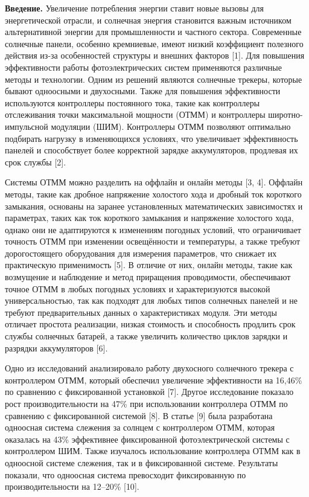 \begin{multicols}{2}
{\bfseries Введение.} Увеличение потребления энергии ставит новые вызовы
для энергетической отрасли, и солнечная энергия становится важным
источником альтернативной энергии для промышленности и частного сектора.
Современные солнечные панели, особенно кремниевые, имеют низкий
коэффициент полезного действия из-за особенностей структуры и внешних
факторов {[}1{]}. Для повышения эффективности работы фотоэлектрических
систем применяются различные методы и технологии. Одним из решений
являются солнечные трекеры, которые бывают одноосными и двухосными.
Также для повышения эффективности используются контроллеры постоянного
тока, такие как контроллеры отслеживания точки максимальной мощности
(ОТММ) и контроллеры широтно-импульсной модуляции (ШИМ). Контроллеры
ОТММ позволяют оптимально подбирать нагрузку в изменяющихся условиях,
что увеличивает эффективность панелей и способствует более корректной
зарядке аккумуляторов, продлевая их срок службы {[}2{]}.

Системы ОТММ можно разделить на оффлайн и онлайн методы {[}3, 4{]}.
Оффлайн методы, такие как дробное напряжение холостого хода и дробный
ток короткого замыкания, основаны на заранее установленных
математических зависимостях и параметрах, таких как ток короткого
замыкания и напряжение холостого хода, однако они не адаптируются к
изменениям погодных условий, что ограничивает точность ОТММ при
изменении освещённости и температуры, а также требуют дорогостоящего
оборудования для измерения параметров, что снижает их практическую
применимость {[}5{]}. В отличие от них, онлайн методы, такие как
возмущение и наблюдение и метод приращения проводимости, обеспечивают
точное ОТММ в любых погодных условиях и характеризуются высокой
универсальностью, так как подходят для любых типов солнечных панелей и
не требуют предварительных данных о характеристиках модуля. Эти методы
отличает простота реализации, низкая стоимость и способность продлить
срок службы солнечных батарей, а также увеличить количество циклов
зарядки и разрядки аккумуляторов {[}6{]}.

Одно из исследований анализировало работу двухосного солнечного трекера
с контроллером ОТММ, который обеспечил увеличение эффективности на
16,46\% по сравнению с фиксированной установкой {[}7{]}. Другое
исследование показало рост производительности на 47\% при использовании
контроллера ОТММ по сравнению с фиксированной системой {[}8{]}. В статье
{[}9{]} была разработана одноосная система слежения за солнцем с
контроллером ОТММ, которая оказалась на 43\% эффективнее фиксированной
фотоэлектрической системы с контроллером ШИМ. Также изучалось
использование контроллера ОТММ как в одноосной системе слежения, так и в
фиксированной системе. Результаты показали, что одноосная система
превосходит фиксированную по производительности на 12--20\% {[}10{]}.


\end{multicols}
